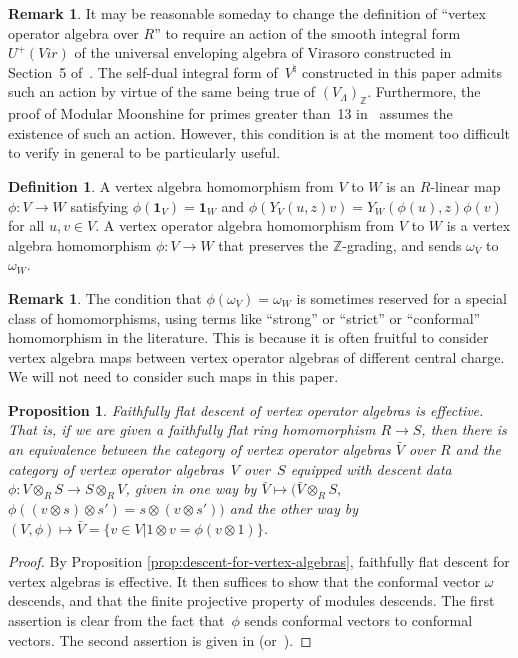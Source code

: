 \documentclass[pdftex]{sigma}
\newcommand{\bZ}{\mathbb{Z}}
\newcommand{\unit}{\mathbf{1}}
\newtheorem{prop}[thm]{Proposition}
\theoremstyle{definition}
\newtheorem{defn}[thm]{Definition}
\newtheorem{rem}[thm]{Remark}
\begin{document}
\begin{rem}It may be reasonable someday to change the definition of ``vertex operator algebra over $R$'' to require an action of the smooth integral form $U^+(Vir)$ of the universal enveloping algebra of Virasoro constructed in Section~5 of~\cite{B99}. The self-dual integral form of~$V^\natural$ constructed in this paper admits such an action by virtue of the same being true of $(V_\Lambda)_{\bZ}$. Furthermore, the proof of Modular Moonshine for primes greater than~13 in~\cite{B98} assumes the existence of such an action. However, this condition is at the moment too difficult to verify in general to be particularly useful.
\end{rem}

\begin{defn}A vertex algebra homomorphism from $V$ to $W$ is an $R$-linear map $\phi\colon V \to W$ satisfying $\phi(\unit_V) = \unit_W$ and $\phi(Y_V(u,z)v) = Y_W(\phi(u),z)\phi(v)$ for all $u,v \in V$. A vertex operator algebra homomorphism from $V$ to $W$ is a vertex algebra homomorphism $\phi\colon V \to W$ that preserves the $\bZ$-grading, and sends $\omega_V$ to $\omega_W$.
\end{defn}

\begin{rem}The condition that $\phi(\omega_V) = \omega_W$ is sometimes reserved for a special class of homomorphisms, using terms like ``strong'' or ``strict'' or ``conformal'' homomorphism in the literature. This is because it is often fruitful to consider vertex algebra maps between vertex operator algebras of different central charge. We will not need to consider such maps in this paper.
\end{rem}

\begin{prop} \label{prop:faithfully-flat-descent-for-voas}Faithfully flat descent of vertex operator algebras is effective. That is, if we are given a faithfully flat ring homomorphism $R \to S$, then there is an equivalence between the category of vertex operator algebras $\bar{V}$ over $R$ and the category of vertex operator algebras~$V$ over~$S$ equipped with descent data $\phi\colon V \otimes_{R} S \to S \otimes_{R} V$, given in one way by $\bar{V} \mapsto (\bar{V} \otimes_{R} S,$ $\phi((v \otimes s) \otimes s') = s \otimes (v \otimes s'))$ and the other way by $(V, \phi) \mapsto \bar{V} = \{v \in V | 1 \otimes v = \phi(v \otimes 1)\}$.
\end{prop}
\begin{proof}By Proposition \ref{prop:descent-for-vertex-algebras}, faithfully flat descent for vertex algebras is effective. It then suffices to show that the conformal vector $\omega$ descends, and that the finite projective property of modules descends. The first assertion is clear from the fact that~$\phi$ sends conformal vectors to conformal vectors. The second assertion is given in \cite[\href{https://stacks.math.columbia.edu/tag/058S}{Proposition 058S}]{Stacks} (or~\cite[Proposition~2.5.2]{EGA4v2}).
\end{proof}
\end{document}
